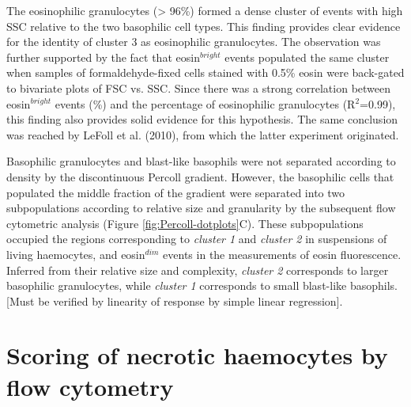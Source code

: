 The eosinophilic granulocytes (> 96\%) formed a dense cluster of events with high SSC relative to the two basophilic cell types. This finding provides clear evidence for the identity of cluster 3 as eosinophilic granulocytes. The observation was further supported by the fact that eosin$^{bright}$ events populated the same cluster when samples of formaldehyde-fixed cells stained with 0.5\% eosin were back-gated to bivariate plots of FSC vs. SSC. Since there was a strong correlation between eosin$^{bright}$ events (\%) and the percentage of eosinophilic granulocytes (R$^{2}$=0.99), this finding also provides solid evidence for this hypothesis. The same conclusion was reached by LeFoll et al. (2010), from which the latter experiment originated.

Basophilic granulocytes and blast-like basophils were not separated according to density by the discontinuous Percoll gradient. However, the basophilic cells that populated the middle fraction of the gradient were separated into two subpopulations according to relative size and granularity by the subsequent flow cytometric analysis (Figure \ref{fig:Percoll-dotplots}C). These subpopulations occupied the regions corresponding to \emph{cluster 1} and \emph{cluster 2} in suspensions of living haemocytes, and eosin$^{dim}$ events in the measurements of eosin fluorescence. Inferred from their relative size and complexity, \emph{cluster 2} corresponds to larger basophilic granulocytes, while \emph{cluster 1} corresponds to small blast-like basophils. [Must be verified by linearity of response by simple linear regression].

\section{Scoring of necrotic haemocytes by flow cytometry}
